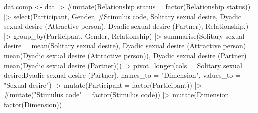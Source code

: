 \documentclass[
  bookmarksnumbered]{article}
\newenvironment{Shaded}{\begin{snugshade}}{\end{snugshade}}
\newcommand{\AttributeTok}[1]{\textcolor[rgb]{0.80,0.80,0.80}{#1}}
\newcommand{\CommentTok}[1]{\textcolor[rgb]{0.50,0.62,0.50}{#1}}
\newcommand{\FunctionTok}[1]{\textcolor[rgb]{0.94,0.94,0.56}{#1}}
\newcommand{\NormalTok}[1]{\textcolor[rgb]{0.80,0.80,0.80}{#1}}
\newcommand{\OtherTok}[1]{\textcolor[rgb]{0.94,0.94,0.56}{#1}}
\newcommand{\SpecialCharTok}[1]{\textcolor[rgb]{0.86,0.64,0.64}{#1}}
\newcommand{\StringTok}[1]{\textcolor[rgb]{0.80,0.58,0.58}{#1}}
\begin{document}
\begin{Shaded}
\begin{Highlighting}[]
\NormalTok{dat.comp }\OtherTok{\textless{}{-}}\NormalTok{ dat }\SpecialCharTok{|\textgreater{}}
  \CommentTok{\#mutate(\textasciigrave{}Relationship status\textasciigrave{} = factor(\textasciigrave{}Relationship status\textasciigrave{})) |\textgreater{} }
  \FunctionTok{select}\NormalTok{(Participant, Gender, }
         \CommentTok{\#\textasciigrave{}Stimulus code\textasciigrave{},}
         \StringTok{\textasciigrave{}}\AttributeTok{Solitary sexual desire}\StringTok{\textasciigrave{}}\NormalTok{, }
         \StringTok{\textasciigrave{}}\AttributeTok{Dyadic sexual desire (Attractive person)}\StringTok{\textasciigrave{}}\NormalTok{, }
         \StringTok{\textasciigrave{}}\AttributeTok{Dyadic sexual desire (Partner)}\StringTok{\textasciigrave{}}\NormalTok{, }
\NormalTok{         Relationship,) }\SpecialCharTok{|\textgreater{}}
  \FunctionTok{group\_by}\NormalTok{(Participant, Gender, Relationship) }\SpecialCharTok{|\textgreater{}} 
  \FunctionTok{summarise}\NormalTok{(}\StringTok{\textasciigrave{}}\AttributeTok{Solitary sexual desire}\StringTok{\textasciigrave{}} \OtherTok{=} 
              \FunctionTok{mean}\NormalTok{(}\StringTok{\textasciigrave{}}\AttributeTok{Solitary sexual desire}\StringTok{\textasciigrave{}}\NormalTok{),}
            \StringTok{\textasciigrave{}}\AttributeTok{Dyadic sexual desire (Attractive person)}\StringTok{\textasciigrave{}} \OtherTok{=} 
              \FunctionTok{mean}\NormalTok{(}\StringTok{\textasciigrave{}}\AttributeTok{Dyadic sexual desire (Attractive person)}\StringTok{\textasciigrave{}}\NormalTok{),}
            \StringTok{\textasciigrave{}}\AttributeTok{Dyadic sexual desire (Partner)}\StringTok{\textasciigrave{}} \OtherTok{=} 
              \FunctionTok{mean}\NormalTok{(}\StringTok{\textasciigrave{}}\AttributeTok{Dyadic sexual desire (Partner)}\StringTok{\textasciigrave{}}\NormalTok{)) }\SpecialCharTok{|\textgreater{}} 
  \FunctionTok{pivot\_longer}\NormalTok{(}\AttributeTok{cols =} \StringTok{\textasciigrave{}}\AttributeTok{Solitary sexual desire}\StringTok{\textasciigrave{}}\SpecialCharTok{:}\StringTok{\textasciigrave{}}\AttributeTok{Dyadic sexual desire (Partner)}\StringTok{\textasciigrave{}}\NormalTok{,}
               \AttributeTok{names\_to =} \StringTok{"Dimension"}\NormalTok{, }
               \AttributeTok{values\_to =} \StringTok{"Sexual desire"}\NormalTok{) }\SpecialCharTok{|\textgreater{}} 
  \FunctionTok{mutate}\NormalTok{(}\AttributeTok{Participant =} \FunctionTok{factor}\NormalTok{(Participant)) }\SpecialCharTok{|\textgreater{}}
  \CommentTok{\#mutate("Stimulus code" = factor(\textasciigrave{}Stimulus code\textasciigrave{})) |\textgreater{}}
  \FunctionTok{mutate}\NormalTok{(}\AttributeTok{Dimension =} \FunctionTok{factor}\NormalTok{(Dimension))}
\end{Highlighting}
\end{Shaded}
\end{document}
